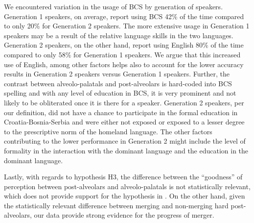 \documentclass[output=paper,modfonts,newtxmath,hidelinks,]{langscibook}
\begin{document}
We encountered variation in the usage of BCS by generation of speakers. Generation 1 speakers, on average, report using BCS 42\% of the time compared to only 20\% for Generation 2 speakers. The more extensive usage in Generation 1 speakers may be a result of the relative language skills in the two languages. Generation 2 speakers, on the other hand, report using English 80\% of the time compared to only 58\% for Generation 1 speakers. We argue that this increased use of English, among other factors helps also to account for the lower accuracy results in Generation 2 speakers versus Generation 1 speakers. Further, the contrast between alveolo-palatals and post-alveolars is hard-coded into BCS spelling and with any level of education in BCS, it is very prominent and not likely to be obliterated once it is there for a speaker. Generation 2 speakers, per our definition, did not have a chance to participate in the formal education in Croatia-Bosnia-Serbia and were either not exposed or exposed to a lesser degree to the prescriptive norm of the homeland language. The other factors contributing to the lower performance in Generation 2 might include the level of formality in the interaction with the dominant language and the education in the dominant language.



Lastly, with regards to hypothesis H3, the difference between the “goodness” of perception between post-alveolars and alveolo-palatals is not statistically relevant, which does not provide support for the hypothesis in \citet{Cavar-etal2016}. On the other hand, given the statistically relevant difference between merging and non-merging hard post-alveolars, our data provide strong evidence for the progress of merger.\largerpage[-1]
\end{document}
